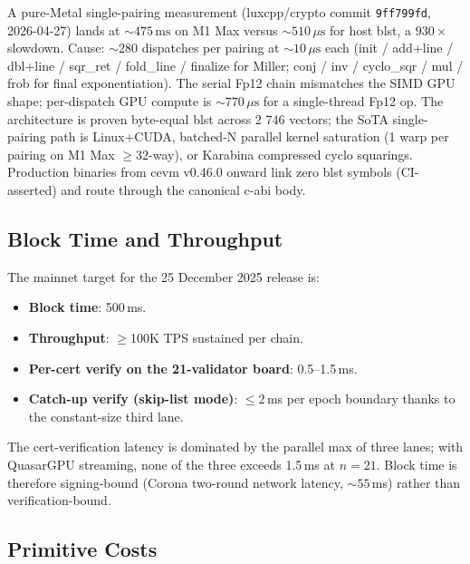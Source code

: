 A pure-Metal single-pairing measurement (luxcpp/crypto commit
\texttt{9ff799fd}, 2026-04-27) lands at ${\sim}475\,\text{ms}$ on M1
Max versus ${\sim}510\,\mu\text{s}$ for host blst, a $930\times$
slowdown. Cause: ${\sim}280$ dispatches per pairing at
${\sim}10\,\mu\text{s}$ each (init / add+line / dbl+line / sqr\_ret /
fold\_line / finalize for Miller; conj / inv / cyclo\_sqr / mul /
frob for final exponentiation). The serial Fp12 chain mismatches the
SIMD GPU shape; per-dispatch GPU compute is ${\sim}770\,\mu\text{s}$
for a single-thread Fp12 op. The architecture is proven byte-equal
blst across 2 746 vectors; the SoTA single-pairing path is Linux+CUDA,
batched-N parallel kernel saturation (1 warp per pairing on M1 Max
$\geq 32$-way), or Karabina compressed cyclo squarings. Production
binaries from cevm v0.46.0 onward link zero blst symbols
(CI-asserted) and route through the canonical c-abi body.

\subsection{Block Time and Throughput}

The mainnet target for the 25 December 2025 release is:
\begin{itemize}[leftmargin=2em,nosep]
\item \textbf{Block time}: 500\,ms.
\item \textbf{Throughput}: $\geq$100K TPS sustained per chain.
\item \textbf{Per-cert verify on the 21-validator board}: 0.5--1.5\,ms.
\item \textbf{Catch-up verify (skip-list mode)}: $\leq$2\,ms per
      epoch boundary thanks to the constant-size third lane.
\end{itemize}

The cert-verification latency is dominated by the parallel max of three
lanes; with QuasarGPU streaming, none of the three exceeds 1.5\,ms at
$n{=}21$. Block time is therefore signing-bound (Corona two-round
network latency, ${\sim}55$\,ms) rather than verification-bound.

\subsection{Primitive Costs}

